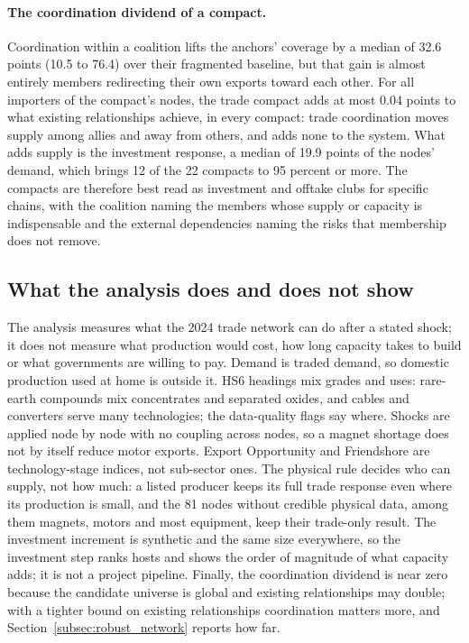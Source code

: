 

\paragraph{The coordination dividend of a compact.} Coordination within a coalition lifts the
anchors' coverage by a median of 32.6 points (10.5 to 76.4) over their fragmented baseline, but that
gain is almost entirely members redirecting their own exports toward each other. For all importers of
the compact's nodes, the trade compact adds at most 0.04 points to what existing relationships
achieve, in every compact: trade coordination moves supply among allies and away from others, and adds
none to the system. What adds supply is the investment response, a median of 19.9 points of the
nodes' demand, which brings 12 of the 22 compacts to 95 percent or more. The compacts are therefore
best read as investment and offtake clubs for specific chains, with the coalition naming the members
whose supply or capacity is indispensable and the external dependencies naming the risks that
membership does not remove.

\subsection{What the analysis does and does not show}
\label{subsec:aib_limitations}

The analysis measures what the 2024 trade network can do after a stated shock; it does not measure
what production would cost, how long capacity takes to build or what governments are willing to pay.
Demand is traded demand, so domestic production used at home is outside it. HS6 headings mix grades
and uses: rare-earth compounds mix concentrates and separated oxides, and cables and converters serve
many technologies; the data-quality flags say where. Shocks are applied node by node with no coupling
across nodes, so a magnet shortage does not by itself reduce motor exports. Export Opportunity and
Friendshore are technology-stage indices, not sub-sector ones. The physical rule decides who can
supply, not how much: a listed producer keeps its full trade response even where its production is
small, and the 81 nodes without credible physical data, among them magnets, motors and most
equipment, keep their trade-only result. The investment increment is synthetic and the same size
everywhere, so the investment step ranks hosts and shows the order of magnitude of what capacity adds;
it is not a project pipeline. Finally, the coordination dividend is near zero because the candidate
universe is global and existing relationships may double; with a tighter bound on existing
relationships coordination matters more, and Section~\ref{subsec:robust_network} reports how far.
